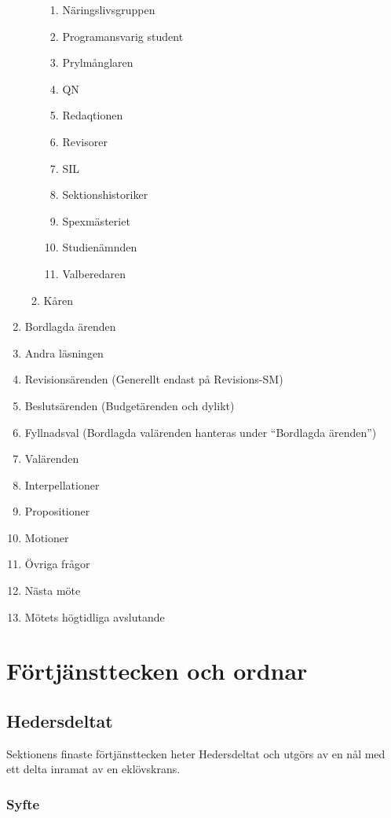 \documentclass{dgovdoc}
\begin{document}
\begin{enumerate}
\begin{enumerate}
\begin{enumerate}
          \item Näringslivsgruppen
          \item Programansvarig student
          \item Prylmånglaren
          \item QN
          \item Redaqtionen
          \item Revisorer
          \item SIL
          \item Sektionshistoriker
          \item Spexmästeriet
          \item Studienämnden
          \item Valberedaren
      \end{enumerate}
      \item Kåren
  \end{enumerate}
  \item Bordlagda ärenden
  \item Andra läsningen
  \item Revisionsärenden (Generellt endast på Revisions-SM)
  \item Beslutsärenden (Budgetärenden och dylikt)
  \item Fyllnadsval (Bordlagda valärenden hanteras under ``Bordlagda ärenden'')
  \item Valärenden
  \item Interpellationer
  \item Propositioner
  \item Motioner
  \item Övriga frågor
  \item Nästa möte
  \item Mötets högtidliga avslutande
\end{enumerate}

\section{Förtjänsttecken och ordnar}

\subsection{Hedersdeltat}

Sektionens finaste förtjänsttecken heter Hedersdeltat och utgörs av en nål med ett delta inramat av en eklövskrans.

\subsubsection{Syfte}
\end{document}
